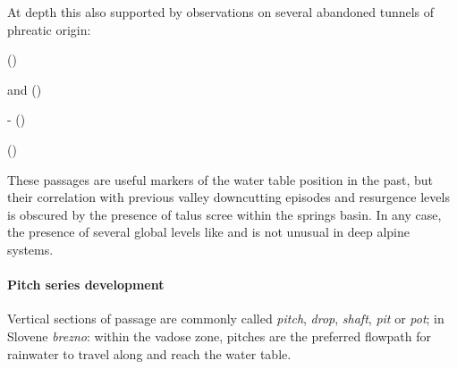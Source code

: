 At depth this also supported by observations on several abandoned tunnels of phreatic origin:
 
\begin{citemize} 
\item {} ()
\item {} and   ()
 \item {} -  ()
 \item {} ()
 \end{citemize} 

These passages are useful markers of the water table position in the past, but their correlation with previous valley downcutting episodes and resurgence levels is obscured by the presence of talus scree within the  springs basin. In any case, the presence of several global levels like  and  is not unusual in deep alpine systems. 

 


\paragraph{Pitch series development}
 Vertical sections of passage are commonly called \emph{pitch}, \emph{drop}, \emph{shaft}, \emph{pit} or \emph{pot}; in Slovene \emph{brezno}: within the vadose zone, pitches are the preferred flowpath for rainwater to travel along and reach the water table.

